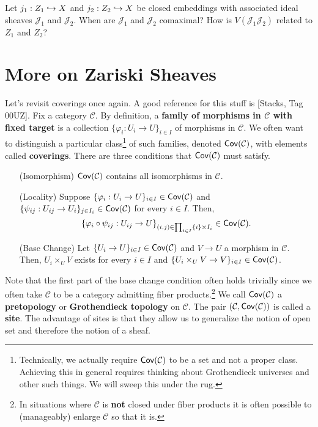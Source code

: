 \documentclass[11pt]{article}
\newcommand{\CC}{\mathcal{C}}
\newcommand{\J}{\mathcal{J}}
\renewcommand{\phi}{\varphi}
\begin{document}
\begin{exercise}
Let $j_1: Z_1\hookrightarrow X$ and $j_2: Z_2\hookrightarrow X$ be closed embeddings with associated ideal sheaves $\J_1$ and $\J_2$. When are $\J_1$ and $\J_2$ comaximal? How is $V(\J_1\J_2)$ related to $Z_1$ and $Z_2$?
\end{exercise}

\section{More on Zariski Sheaves}
Let's revisit coverings once again. A good reference for this stuff is [Stacks, Tag 00UZ]. Fix a category $\CC$. By definition, a \textbf{family of morphisms in $\CC$ with fixed target} is a collection $\{\phi_i: U_i\to U\}_{i\in I}$ of morphisms in $\CC$. We often want to distinguish a particular class\footnote{Technically, we actually require $\Cov(\CC)$ to be a set and not a proper class. Achieving this in general requires thinking about Grothendieck universes and other such things. We will sweep this under the rug.} of such families, denoted $\Cov(\CC)$, with elements called \textbf{coverings}. There are three conditions that $\Cov(\CC)$ must satisfy.
\begin{itemize}
\item[(Isomorphism)] $\Cov(\CC)$ contains all isomorphisms in $\CC$.

\item[(Locality)] Suppose $\{\phi_i: U_i\to U\}_{i\in I}\in\Cov(\CC)$ and $\{\psi_{ij}: U_{ij}\to U_i\}_{j\in I_i}\in\Cov(\CC)$ for every $i\in I$. Then, 
$$\{\phi_i\circ\psi_{ij}: U_{ij}\to U\}_{(i,j)\in\prod_{i\in I}\{i\}\times I_i}\in\Cov(\CC).$$

\item[(Base Change)] Let $\{U_i\to U\}_{i\in I}\in\Cov(\CC)$ and $V\to U$ a morphism in $\CC$. Then, $U_i\times_UV$ exists for every $i\in I$ and $\{U_i\times_UV\to V\}_{i\in I}\in\Cov(\CC)$.
\end{itemize}

Note that the first part of the base change condition often holds trivially since we often take $\CC$ to be a category admitting fiber products.\footnote{In situations where $\CC$ is \textbf{not} closed under fiber products it is often possible to (manageably) enlarge $\CC$ so that it is.} We call $\Cov(\CC)$ a \textbf{pretopology} or \textbf{Grothendieck topology} on $\CC$. The pair $(\CC,\Cov(\CC))$ is called a \textbf{site}. The advantage of sites is that they allow us to generalize the notion of open set and therefore the notion of a sheaf. 
\end{document}

